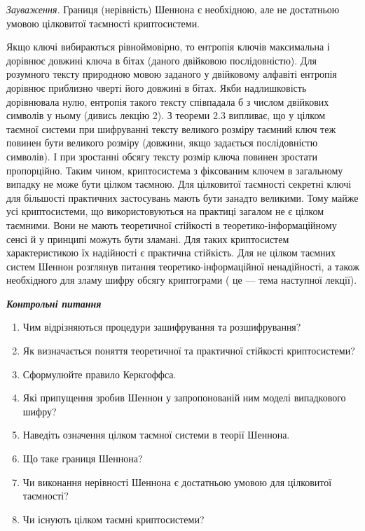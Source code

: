 {\textit{Зауваження.} Границя (нерівність) Шеннона є необхідною, але не
достатньою умовою цілковитої таємності криптосистеми.

Якщо ключі вибираються рівноймовірно, то ентропія ключів максимальна і дорівнює
довжині ключа в бітах (даного двійковою послідовністю). Для розумного тексту
природною мовою заданого у двійковому алфавіті ентропія дорівнює приблизно
чверті його довжині в бітах. Якби надлишковість дорівнювала нулю, ентропія
такого тексту співпадала б з числом двійкових символів у ньому (дивись лекцію
2). З теореми 2.3 випливає, що у цілком таємної системи при шифруванні тексту
великого розміру таємний ключ теж повинен бути великого розміру (довжини, якщо
задається послідовністю символів). І при зростанні обсягу тексту розмір ключа
повинен зростати пропорційно. Таким чином, криптосистема з фіксованим ключем в
загальному випадку не може бути цілком таємною. Для цілковитої таємності
секретні ключі для більшості практичних застосувань мають бути занадто
великими. Тому майже усі криптосистеми, що використовуються на практиці загалом
не є цілком таємними. Вони не мають теоретичної стійкості в
теоретико-інформаційному сенсі й  у принципі можуть бути зламані. Для таких
криптосистем характеристикою їх надійності є практична стійкість. Для не цілком
таємних систем Шеннон розглянув питання теоретико-інформаційної ненадійності, а
також необхідного для зламу шифру обсягу криптограми ( це --- тема наступної
лекції).


\bigskip

{\centering\bfseries\itshape
Контрольні питання
\par}


\bigskip


\bigskip

\liststyleWWviiiNumxlv
\begin{enumerate}
\item Чим відрізняються процедури зашифрування та розшифрування?
\item Як визначається поняття теоретичної та практичної стійкості криптосистеми?
\item Сформулюйте правило Керкгоффса.
\item Які припущення зробив Шеннон у запропонованій ним моделі випадкового
шифру?
\item Наведіть означення цілком таємної системи в теорії Шеннона.
\item Що таке границя Шеннона?
\item Чи виконання нерівності Шеннона є достатньою умовою для цілковитої
таємності?
\item Чи існують цілком таємні криптосистеми? 
\end{enumerate}

}
